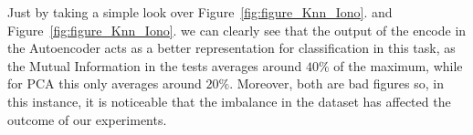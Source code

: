 Just by taking a simple look over Figure~\ref{fig:figure_Knn_Iono}. and Figure~\ref{fig:figure_Knn_Iono}. 
we can clearly see that the output of the encode in the Autoencoder acts as a better representation for classification in this task, as the Mutual Information in the tests averages around $40\%$ of the maximum, while for PCA this only averages around $20\%$.
% 
Moreover, both are bad figures so, in this instance, it is noticeable that the imbalance in the dataset has affected the outcome of our experiments. 
%
%

